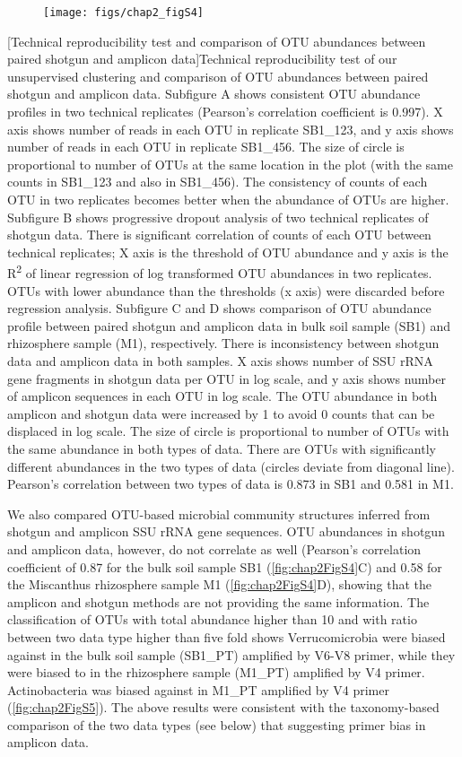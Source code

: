 \documentclass[]{msu-thesis}
\begin{document}
\begin{figure}[tbph!]
  \centering
  \texttt{[image: figs/chap2\_figS4]}
\end{figure}
\clearpage
\SingleSpacing
{}[Technical reproducibility test and comparison of OTU abundances between paired shotgun and amplicon data]{Technical reproducibility test of our unsupervised clustering and comparison of OTU abundances between paired shotgun and amplicon data. Subfigure A shows consistent OTU abundance profiles in two technical replicates (Pearson’s correlation coefficient is 0.997). X axis shows number of reads in each OTU in replicate SB1\_123, and y axis shows number of reads in each OTU in replicate SB1\_456. The size of circle is proportional to number of OTUs at the same location in the plot (with the same counts in SB1\_123 and also in SB1\_456).  The consistency of counts of each OTU in two replicates becomes better when the abundance of OTUs are higher. Subfigure B shows progressive dropout analysis of two technical replicates of shotgun data. There is significant correlation of counts of each OTU between technical replicates; X axis is the threshold of OTU abundance and y axis is the R\textsuperscript{2} of linear regression of log transformed OTU abundances in two replicates. OTUs with lower abundance than the thresholds (x axis) were discarded before regression analysis. Subfigure C and D shows comparison of OTU abundance profile between paired shotgun and amplicon data in bulk soil sample (SB1) and rhizosphere sample (M1), respectively. There is inconsistency between shotgun data and amplicon data in both samples. X axis shows number of SSU rRNA gene fragments in shotgun data per OTU in log scale, and y axis shows number of amplicon sequences in each OTU in log scale. The OTU abundance in both amplicon and shotgun data were increased by 1 to avoid 0 counts that can be displaced in log scale. The size of circle is proportional to number of OTUs with the same abundance in both types of data. There are OTUs with significantly different abundances in the two types of data (circles deviate from diagonal line). Pearson’s correlation between two types of data is 0.873 in SB1 and 0.581 in M1.}
\label{fig:chap2FigS4}
\DoubleSpacing
\bigskip

We also compared OTU-based microbial community structures inferred from shotgun and amplicon SSU rRNA gene sequences. OTU abundances in shotgun and amplicon data, however, do not correlate as well (Pearson’s correlation coefficient of 0.87 for the bulk soil sample SB1 (\cref{fig:chap2FigS4}C) and 0.58 for the Miscanthus rhizosphere sample M1 (\cref{fig:chap2FigS4}D), showing that the amplicon and shotgun methods are not providing the same information. The classification of OTUs with total abundance higher than 10 and with ratio between two data type higher than five fold shows Verrucomicrobia were biased against in the bulk soil sample (SB1\_PT) amplified by V6-V8 primer, while they were biased to in the rhizosphere sample (M1\_PT) amplified by V4 primer. Actinobacteria was biased against in M1\_PT amplified by V4 primer (\cref{fig:chap2FigS5}).  The above results were consistent with the taxonomy-based comparison of the two data types (see below) that suggesting primer bias in amplicon data.
\end{document}
